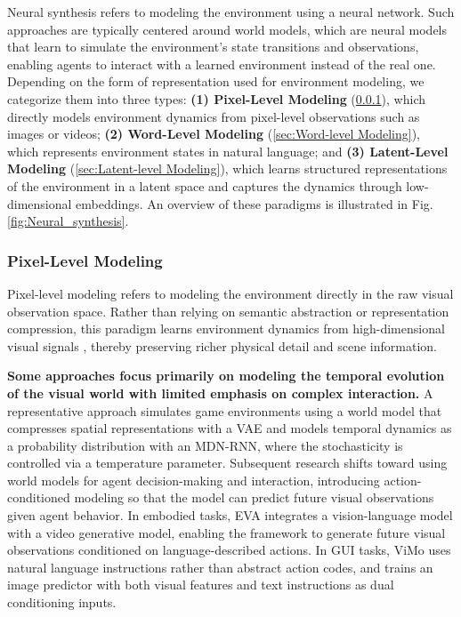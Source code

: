 \documentclass{llmxive}
\begin{document}
Neural synthesis refers to modeling the environment using a neural network. Such approaches are typically centered around world models, which are neural models that learn to simulate the environment's state transitions and observations, enabling agents to interact with a learned environment instead of the real one. Depending on the form of representation used for environment modeling, we categorize them into three types: \textbf{(1) Pixel-Level Modeling} (\cref{sec:Pixel-level Modeling}), which directly models environment dynamics from pixel-level observations such as images or videos; \textbf{(2) Word-Level Modeling} (\cref{sec:Word-level Modeling}), which represents environment states in natural language; and \textbf{(3) Latent-Level Modeling} (\cref{sec:Latent-level Modeling}), which learns structured representations of the environment in a latent space and captures the dynamics through low-dimensional embeddings. An overview of these paradigms is illustrated in Fig. \ref{fig:Neural_synthesis}.


\subsubsection{Pixel-Level Modeling}
\label{sec:Pixel-level Modeling}
Pixel-level modeling refers to modeling the environment directly in the raw visual observation space. Rather than relying on semantic abstraction or representation compression, this paradigm learns environment dynamics from high-dimensional visual signals \cite{DIAMOND, DreamGen, Pandora}, thereby preserving richer physical detail and scene information. 

\textbf{Some approaches focus primarily on modeling the temporal evolution of the visual world with limited emphasis on complex interaction.} 
A representative approach \cite{Recurrent_World_Models_Facilitate_Policy_Evolution} simulates game environments using a world model that compresses spatial representations with a VAE and models temporal dynamics as a probability distribution with an MDN-RNN, where the stochasticity is controlled via a temperature parameter. Subsequent research shifts toward using world models for agent decision-making and interaction, introducing action-conditioned modeling so that the model can predict future visual observations given agent behavior. In embodied tasks, EVA \cite{EVA} integrates a vision-language model with a video generative model, enabling the framework to generate future visual observations conditioned on language-described actions. In GUI tasks, ViMo \cite{ViMo} uses natural language instructions rather than abstract action codes, and trains an image predictor with both visual features and text instructions as dual conditioning inputs.
\end{document}
